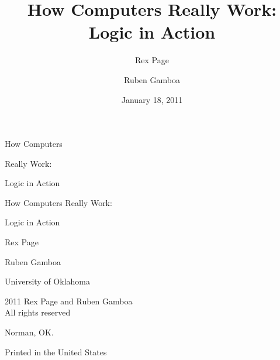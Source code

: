 \documentclass[letterpaper,10pt,extrafontsizesmtwoside,onecolumn,openright,draft,fleqn]{memoir}
\title{How Computers Really Work: Logic in Action}
\author{Rex Page \and Ruben Gamboa}
\date{January 18, 2011}
\begin{document}
\frontmatter


\pagestyle{empty}


\vspace*{\fill}
\begin{adjustwidth}{1in}{1in}
\begin{flushleft}
\HUGE\sffamily How Computers
\end{flushleft}
\begin{center}
\HUGE\sffamily  Really Work:
\end{center}
\begin{flushright}
\HUGE\sffamily  Logic in Action
\end{flushright}
\end{adjustwidth}
\vspace*{\fill}
\cleardoublepage

\vspace*{\fill}
\begin{center}
\HUGE\textsf{How Computers Really Work:}\par
\end{center}
\begin{center}
\HUGE\textsf{Logic in Action}\par
\end{center}

\begin{center}
\LARGE\textsf{Rex Page}\par
\LARGE\textsf{Ruben Gamboa}\par
\end{center}
\vspace*{\fill}
\begin{center}
University of Oklahoma
\end{center}
\clearpage

\begingroup
\footnotesize
\setlength{\parindent}{0pt}
\setlength{\parskip}{\baselineskip}
\textcopyright{} 2011 Rex Page and Ruben Gamboa \\
All rights reserved

Norman, OK.

Printed in the United States
\end{document}
